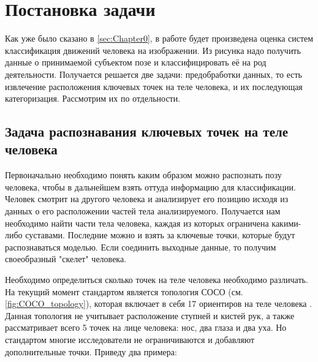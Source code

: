 \section{Постановка задачи}
\label{sec:Chapter1} 

Как уже было сказано в \autoref{sec:Chapter0}, в работе будет произведена оценка систем классификация движений человека на изображении. Из рисунка надо получить данные о принимаемой субъектом позе и классифицировать её на род деятельности. Получается решается две задачи: предобработки данных, то есть извлечение расположения ключевых точек на теле человека, и их последующая категоризация. Рассмотрим их по отдельности.


\subsection{Задача распознавания ключевых точек на теле человека}
\label{subsec:Theory of keypoint detection}

Первоначально необходимо понять каким образом можно распознать позу человека, чтобы в дальнейшем взять оттуда информацию для классификации. Человек смотрит на другого человека и анализирует его позицию исходя из данных о его расположении частей тела анализируемого. Получается нам необходимо найти части тела человека, каждая из которых ограничена какими-либо суставами. Последние можно и взять за ключевые точки, которые будут распознаваться моделью. Если соединить выходные данные, то получим своеобразный "скелет"{} человека.

Необходимо определиться сколько точек на теле человека необходимо различать. На текущий момент стандартом является топология СОСО (см. \autoref{fig:COCO_topology}), которая включает в себя 17 ориентиров на теле человека \cite{COCO_topology, COCO_dataset}. Данная топология не учитывает расположение ступней и кистей рук, а также рассматривает всего 5 точек на лице человека: нос, два глаза и два уха. Но стандартом многие исследователи не ограничиваются и добавляют дополнительные точки. Приведу два примера:

